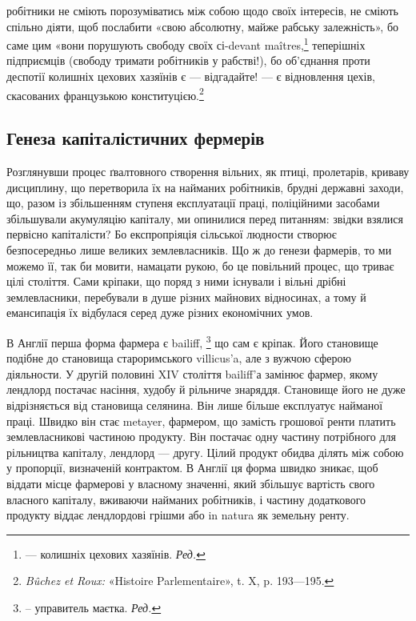 \parcont{}  %
робітники не сміють порозуміватись між собою щодо своїх інтересів,
не сміють спільно діяти, щоб послабити «свою абсолютну,
майже рабську залежність», бо саме цим «вони порушують свободу
своїх сі-devant maîtres,\footnote*{
— колишніх цехових хазяїнів. \emph{Ред.}
} теперішніх підприємців (свободу
тримати робітників у рабстві!), бо об’єднання проти деспотії
колишніх цехових хазяїнів є — відгадайте! — є відновлення цехів,
скасованих французькою конституцією.\footnote{
\emph{Bûchez et Roux: } «Histoire Parlementaire», t. X, p. 193—195.
}
\subsection{Генеза капіталістичних фермерів}
Розглянувши процес ґвалтовного створення вільних, як птиці,
пролетарів, криваву дисциплину, що перетворила їх на найманих
робітників, брудні державні заходи, що, разом із збільшенням
ступеня експлуатації праці, поліційними засобами збільшували
акумуляцію капіталу, ми опинилися перед питанням: звідки взялися
первісно капіталісти? Бо експропріяція сільської людности
створює безпосередньо лише великих землевласників. Що ж до
генези фармерів, то ми можемо її, так би мовити, намацати рукою,
бо це повільний процес, що триває цілі століття. Сами кріпаки,
що поряд з ними існували і вільні дрібні землевласники, перебували
в душе різних майнових відносинах, а тому й емансипація
їх відбулася серед дуже різних економічних умов.

В Англії перша форма фармера є bailiff,
 \footnote*{– управитель маєтка. \emph{Ред.}
} що сам є кріпак.
Його становище подібне до становища староримського villicus’a,
але з вужчою сферою діяльности. У другій половині XIV століття
bailiff’а замінює фармер, якому лендлорд постачає насіння,
худобу й рільниче знаряддя. Становище його не дуже відрізняється
від становища селянина. Він лише більше експлуатує
найманої праці. Швидко він стає metayer, фармером, що замість
грошової ренти платить землевласникові частиною продукту.
Він постачає одну частину потрібного для рільництва капіталу,
лендлорд — другу. Цілий продукт обидва ділять між собою у
пропорції, визначеній контрактом. В Англії ця форма швидко
зникає, щоб віддати місце фармерові у власному значенні, який
збільшує вартість свого власного капіталу, вживаючи найманих
робітників, і частину додаткового продукту віддає лендлордові
грішми або in natura як земельну ренту.

